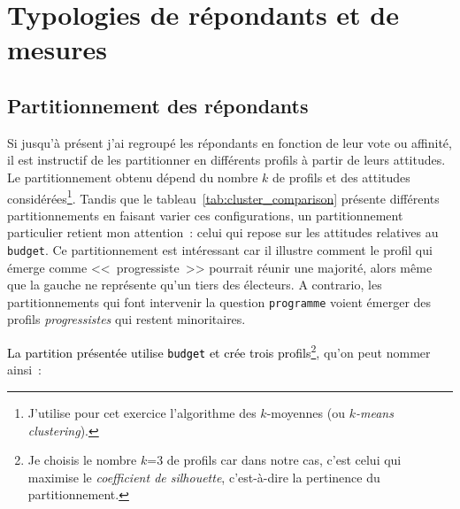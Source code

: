 \documentclass[12pt,french]{article}
\newcommand{\blue}[1]{\textcolor{black}{#1}} %
\begin{document}
\section{Typologies de répondants et de mesures}
\label{sec:clusters}

\subsection{Partitionnement des répondants}

Si jusqu'à présent j'ai regroupé les répondants en fonction de leur vote ou affinité, il est instructif de les partitionner en différents profils à partir de leurs attitudes. Le partitionnement obtenu dépend du nombre $k$ de profils et des attitudes considérées\footnote{J'utilise pour cet exercice l'algorithme des $k$-moyennes (ou \textit{$k$-means clustering}).}. Tandis que le tableau~\ref{tab:cluster_comparison} présente différents partitionnements en faisant varier ces configurations, un partitionnement particulier retient mon attention~: celui qui repose sur les attitudes relatives au \texttt{budget}. Ce partitionnement est intéressant car il illustre comment le profil qui émerge comme <<~progressiste~>> pourrait réunir une majorité, alors même que la gauche ne représente qu'un tiers des électeurs. A contrario, %
les partitionnements qui font intervenir %
la question \texttt{programme} voient émerger des profils \textit{progressistes} qui restent minoritaires. 

\blue{La partition présentée utilise \texttt{budget} et crée trois profils}\footnote{Je choisis le nombre $k$=3 de profils car dans notre cas, c'est celui qui maximise le \textit{coefficient de silhouette}, c'est-à-dire la pertinence du partitionnement.}, qu'on peut nommer ainsi~:
\end{document}
